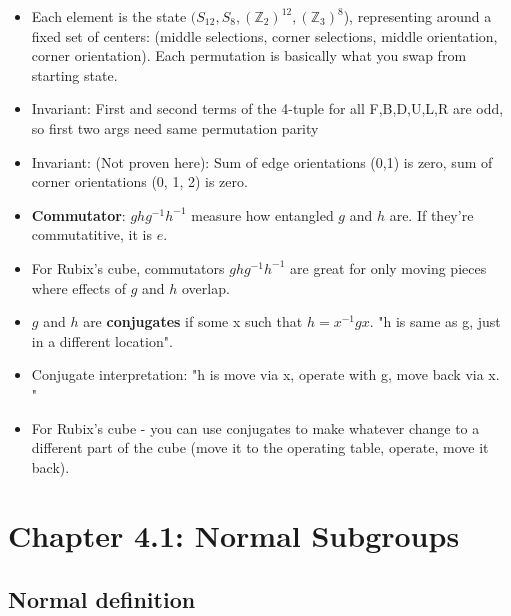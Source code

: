 \documentclass[11pt, oneside]{article}   	%
\begin{document}
\begin{itemize}
\item Each element is the state $(S_{12}, S_8, (\mathbb{Z}_2)^{12}, (\mathbb{Z}_3)^8$), representing around a fixed set of centers: (middle selections, corner selections, middle orientation, corner orientation).  Each permutation is basically what you swap from starting state.
\item Invariant: First and second terms of the 4-tuple for all F,B,D,U,L,R are odd, so first two args need same permutation parity
\item Invariant: (Not proven here): Sum of edge orientations (0,1) is zero, sum of corner orientations (0, 1, 2) is zero.
\item \textbf{Commutator}: $ghg^{-1}h^{-1}$ measure how entangled $g$ and $h$ are.  If they're commutatitive, it is $e$.
\item For Rubix's cube, commutators  $ghg^{-1}h^{-1}$ are great for only moving pieces where effects of $g$ and $h$ overlap.
\item $g$ and $h$ are \textbf{conjugates} if some x such that $h = x^{-1}gx$.   "h is same as g, just in a different location".
\item Conjugate interpretation: "h is move via x, operate with g, move back via x.  "\
\item For Rubix's cube - you can use conjugates to make whatever change to a different part of the cube (move it to the operating table, operate, move it back).
\end{itemize}

\section{Chapter 4.1: Normal Subgroups}

\subsection{Normal definition}
\end{document}
